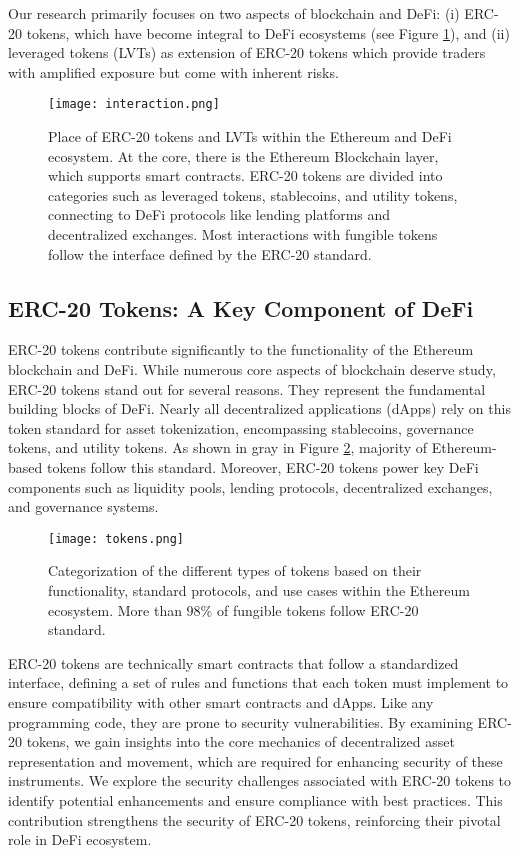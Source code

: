 Our research primarily focuses on two aspects of blockchain and DeFi: (i) ERC-20 tokens, which have become integral to DeFi ecosystems (see Figure \ref{fig:interaction}), and (ii) leveraged tokens (LVTs) as extension of ERC-20 tokens which provide traders with amplified exposure but come with inherent risks.

\begin{figure}[t]
	\centering
	\texttt{[image: interaction.png]}
	\caption[The Ethereum and DeFi ecosystem]{Place of ERC-20 tokens and LVTs within the Ethereum and DeFi ecosystem. At the core, there is the Ethereum Blockchain layer, which supports smart contracts. ERC-20 tokens are divided into categories such as leveraged tokens, stablecoins, and utility tokens, connecting to DeFi protocols like lending platforms and decentralized exchanges. Most interactions with fungible tokens follow the interface defined by the ERC-20 standard.}
	\label{fig:interaction}
\end{figure}

\subsection{ERC-20 Tokens: A Key Component of DeFi}
ERC-20 tokens contribute significantly to the functionality of the Ethereum blockchain and DeFi. While numerous core aspects of blockchain deserve study, ERC-20 tokens stand out for several reasons. They represent the fundamental building blocks of DeFi. Nearly all decentralized applications (dApps) rely on this token standard for asset tokenization, encompassing stablecoins, governance tokens, and utility tokens. As shown in gray in Figure \ref{fig:tokens}, majority of Ethereum-based tokens follow this standard. Moreover, ERC-20 tokens power key DeFi components such as liquidity pools, lending protocols, decentralized exchanges, and governance systems.

\begin{figure}[t]
	\centering
	\texttt{[image: tokens.png]}
	\caption[Categorization of the different types of tokens]{Categorization of the different types of tokens based on their functionality, standard protocols, and use cases within the Ethereum ecosystem. More than 98\% of fungible tokens follow ERC-20 standard.}
	\label{fig:tokens}
\end{figure}

ERC-20 tokens are technically smart contracts that follow a standardized interface, defining a set of rules and functions that each token must implement to ensure compatibility with other smart contracts and dApps. Like any programming code, they are prone to security vulnerabilities. By examining ERC-20 tokens, we gain insights into the core mechanics of decentralized asset representation and movement, which are required for enhancing security of these instruments. We explore the security challenges associated with ERC-20 tokens to identify potential enhancements and ensure compliance with best practices. This contribution strengthens the security of ERC-20 tokens, reinforcing their pivotal role in DeFi ecosystem.


